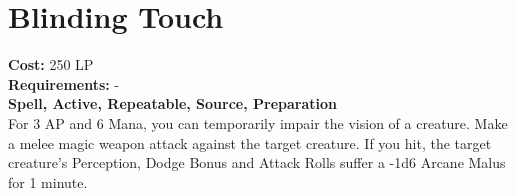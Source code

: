 \section{Blinding Touch}\label{spell:blindingtouch}
\textbf{Cost:} 250 LP\\
\textbf{Requirements:} -\\
\textbf{Spell, Active, Repeatable, Source, Preparation}\\
For 3 AP and 6 Mana, you can temporarily impair the vision of a creature.
Make a melee magic weapon attack against the target creature.
If you hit, the target creature's Perception, Dodge Bonus and Attack Rolls suffer a -1d6 Arcane Malus for 1 minute.\\